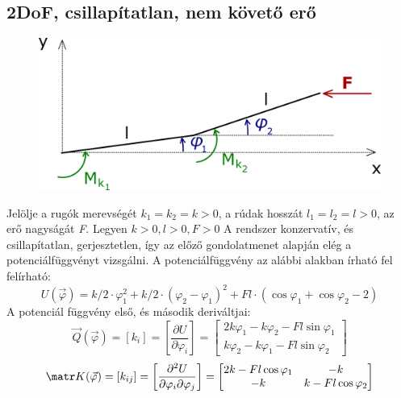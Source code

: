 \documentclass[12pt,twoside]{article}
\begin{document}
\subsection{2DoF, csillapítatlan, nem követő erő} %
\begin{figure}[H]
\center
\includegraphics[scale=1]{2szab_nem_koveto}
\end{figure}
Jelölje a rugók merevségét $  k_1=k_2=k>0 $, a rúdak hosszát $  l_1=l_2=l>0 $, az erő nagyságát \emph{F}. Legyen $ k>0, l>0, F>0 $  \newline
A rendszer konzervatív, és csillapítatlan, gerjesztetlen, így az előző gondolatmenet alapján elég a potenciálfüggvényt vizsgálni. \newline
A potenciálfüggvény az alábbi alakban írható fel felírható:
\begin{equation} \label{eq:Newton}
U(\vec\varphi)=k/2 \cdot \varphi_1 ^2 + k/2 \cdot (\varphi_2- \varphi_1) ^2 +F l \cdot ( \cos\varphi_1+ \cos\varphi_2 -2)
\end{equation}
A potenciál függvény első, és második deriváltjai:
\begin{equation} \label{eq:Newton}
\vec Q(\vec\varphi) =[k_{i}]=\left[ \frac{\partial U}{\partial \varphi_i }\right]=
\begin{bmatrix}
2k \varphi_1 - k \varphi_2-Fl\sin\varphi_1\\
k \varphi_2 - k \varphi_1-Fl\sin\varphi_2
\end{bmatrix}
\end{equation}
\begin{equation} \label{eq:Newton}
\matr K(\vec\varphi) =[k_{ij}]=\left[ \frac{\partial^2 U}{\partial \varphi_i \partial \varphi_j}\right]=
\begin{bmatrix}
2k-Fl \cos\varphi_1 & -k \\
-k & k-Fl \cos\varphi_2 
\end{bmatrix}
\end{equation}
\end{document}
